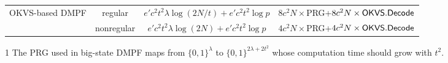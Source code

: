 \begin{table*}
\begin{threeparttable}
\begin{tabular}{cccc}
            \multirow{2}{*}{OKVS-based DMPF} & regular & $e'c^2t^2\lambda\log(2N/t)+e'c^2t^2\log p$ & $8c^2N\times$PRG+$8c^2N\times{\sf OKVS}.{\sf Decode}$  \\
            & nonregular & $e'c^2t^2\lambda\log(2N)+e'c^2t^2\log p$ & $4c^2N\times$PRG+$4c^2N\times{\sf OKVS}.{\sf Decode}$\\
            \bottomrule
		\end{tabular}
    \begin{tablenotes}
      \item [1] The PRG used in big-state DMPF maps from $\{0,1\}^\lambda$ to $\{0,1\}^{2\lambda+2t^2}$ whose computation time should grow with $t^2$. 
    \end{tablenotes}
  \end{threeparttable}
\end{table*}



\iffalse
